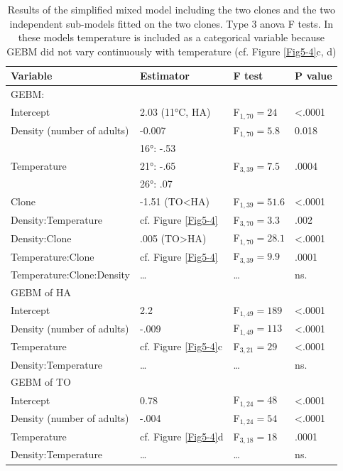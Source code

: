 \begin{table}[!h] \centering \caption{ Results of the simplified mixed model
including the two clones and the two independent sub-models fitted on the two
clones. Type 3 anova F tests. In these models temperature is included as a
categorical variable because GEBM did not vary continuously with temperature
(cf. Figure \ref{Fig5-4}c, d)}\label{tab5-3}
\begin{tabular}{llll}
\hline
Variable & Estimator & F test & P value \\
 \hline \hline
GEBM: & & & \\
Intercept & 2.03 (11°C, HA) & F$_{1,70}=24$ & <.0001 \\
Density (number of adults) & -0.007 & F$_{1,70}=5.8$ & 0.018\\
\multirow{3}{*}{Temperature} & 16°: -.53 & \multirow{3}{*}{F$_{3,39}=7.5$} & \multirow{3}{*}{.0004} \\
 & 21°: -.65 & & \\
 & 26°: .07 & & \\
 Clone & -1.51 (TO<HA) & F$_{1,39}=51.6$ & <.0001\\
 Density:Temperature & cf. Figure \ref{Fig5-4} & F$_{3,70}=3.3$ & .002\\
 Density:Clone & .005 (TO>HA) & F$_{1,70}=28.1$ & <.0001\\
 Temperature:Clone & cf. Figure \ref{Fig5-4} & F$_{3,39}=9.9$ & .0001\\
 Temperature:Clone:Density & \ldots & \ldots & ns.\\
 \hline
 GEBM of HA & & & \\
 Intercept & 2.2 & F$_{1,49}=189$ & <.0001\\
 Density (number of adults) & -.009 & F$_{1,49}=113$ & <.0001\\
 Temperature & cf. Figure \ref{Fig5-4}c & F$_{3,21}=29$ & <.0001\\
 Density:Temperature &\ldots&\ldots& ns.\\
 \hline
 GEBM of TO & & & \\
 Intercept & 0.78 & F$_{1,24}=48$ & <.0001\\
 Density (number of adults) & -.004 & F$_{1,24}=54$ & <.0001\\
 Temperature & cf. Figure \ref{Fig5-4}d & F$_{3,18}=18$ & .0001\\
 Density:Temperature &\ldots&\ldots& ns.\\
\hline \hline
\end{tabular}

\end{table}

